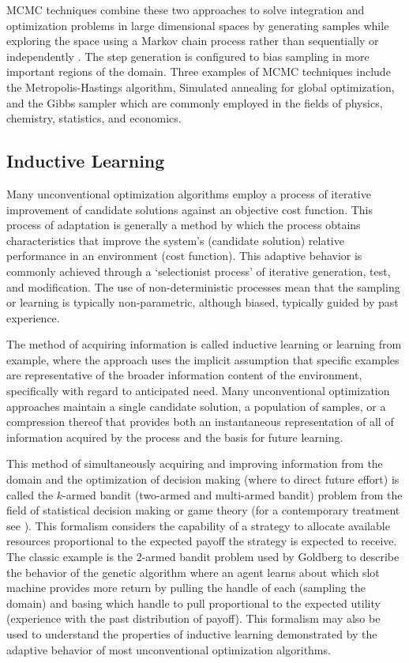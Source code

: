 \documentclass[a4paper, 11pt]{article}
\begin{document}
MCMC techniques combine these two approaches to solve integration and optimization problems in large dimensional spaces by generating samples while exploring the space using a Markov chain process rather than sequentially or independently \cite{Andrieu2003}. The step generation is configured to bias sampling in more important regions of the domain. Three examples of MCMC techniques include the Metropolis-Hastings algorithm, Simulated annealing for global optimization, and the Gibbs sampler which are commonly employed in the fields of physics, chemistry, statistics, and economics. 

% 
% 
\subsection{Inductive Learning}
\label{subsec:induction}
Many unconventional optimization algorithms employ a process of iterative improvement of candidate solutions against an objective cost function. This process of adaptation is generally a method by which the process obtains characteristics that improve the system's (candidate solution) relative performance in an environment (cost function). This adaptive behavior is commonly achieved through a `selectionist process' of iterative generation, test, and modification. The use of non-deterministic processes mean that the sampling or learning is typically non-parametric, although biased, typically guided by past experience. 

The method of acquiring information is called inductive learning or learning from example, where the approach uses the implicit assumption that specific examples are representative of the broader information content of the environment, specifically with regard to anticipated need. Many unconventional optimization approaches maintain a single candidate solution, a population of samples, or a compression thereof that provides both an instantaneous representation of all of information acquired by the process and the basis for future learning. 

This method of simultaneously acquiring and improving information from the domain and the optimization of decision making (where to direct future effort) is called the $k$-armed bandit (two-armed and multi-armed bandit) problem from the field of statistical decision making or game theory \cite{Robbins1952} (for a contemporary treatment see \cite{Bergemann2006}). This formalism considers the capability of a strategy to allocate available resources proportional to the expected payoff the strategy is expected to receive. The classic example is the 2-armed bandit problem used by Goldberg to describe the behavior of the genetic algorithm \cite{Goldberg1989} where an agent learns about which slot machine provides more return by pulling the handle of each (sampling the domain) and basing which handle to pull proportional to the expected utility (experience with the past distribution of payoff). This formalism may also be used to understand the properties of inductive learning demonstrated by the adaptive behavior of most unconventional optimization algorithms.
\end{document}

